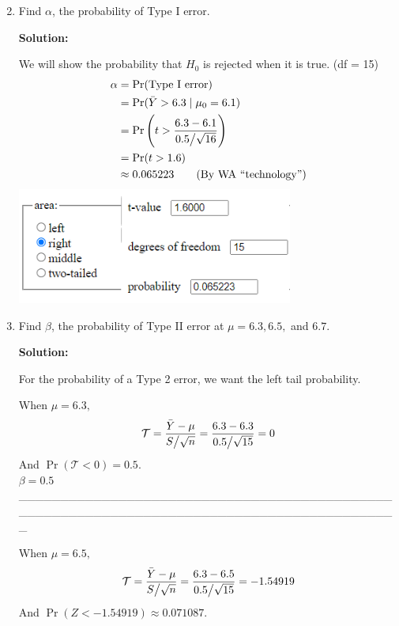 \begin{enumerate}[label=(\alph*)]
    \setcounter{enumii}{1}
    \item Find $\alpha$, the probability of Type I error.
    \begin{mybox}
        \textbf{Solution: }

        \nl We will show the probability that $H_0$ is rejected when it is true. (df = 15)
        \begin{align*}
            \alpha &= \Pr(\text{Type I error})\\
            &= \Pr(\ybar > 6.3 \mid \mu_0 = 6.1)\\
            &= \Pr\pars{t > \frac{6.3-6.1}{0.5 \big/ \sqrt{16}}}\\
            &= \Pr(t > 1.6)\\
            &\approx 0.065223 \tag{By WA \say{technology}}
        \end{align*}
        \includegraphics[height=1.5in]{p1b.PNG}
    \end{mybox}
\newpage
    \item Find $\beta$, the probability of Type II error at $\mu=6.3, 6.5,$ and $6.7$.
    \begin{mybox}
        \textbf{Solution: }

        \nl For the probability of a Type 2 error, we want the left tail probability.

        \nl When $\mu = 6.3,$
        $$\mathcal{T}= \frac{\bar{Y} - \mu}{S \big/\sqrt{n}} = \frac{6.3-6.3}{0.5 \big/\sqrt{15}} = 0$$
        And $\Pr(\mathcal{T} < 0) = 0.5$.\\ $\beta = 0.5$ \\\_\_\_\_\_\_\_\_\_\_\_\_\_\_\_\_\_\_\_\_\_\_\_\_\_\_\_\_\_\_\_\_\_\_\_\_\_\_\_\_\_\_\_\_\_\_\_\_\_\_\_\_\_\_\_\_\_\_\_\_\_\_\_\_\_\_\_\_\_\_\_\_\_\_\_\_\_\_\_\_\_\_\_\_\_\_\_\_\_\_\_
        
        
        \nnl When $\mu = 6.5,$
        $$\mathcal{T}= \frac{\bar{Y} - \mu}{S \big/\sqrt{n}} = \frac{6.3-6.5}{0.5 \big/\sqrt{15}} = -1.54919$$
        And $\Pr(Z < -1.54919) \approx 0.071087$.


\end{mybox}
\end{enumerate}

